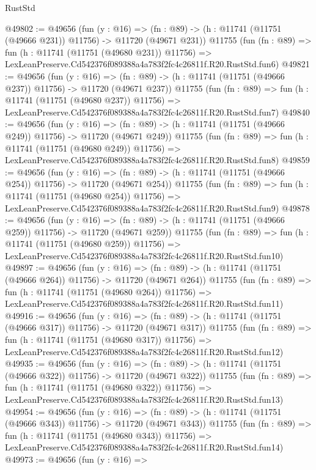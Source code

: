 \begin{lexlean}{RustStd}
\begin{coremodule}
@49802 := @49656
    (fun (y : @16) =>
    (fn : @89) -> (h : @11741 (@11751 (@49666 @231)) @11756) -> @11720 (@49671 @231))
    @11755
    (fun (fn : @89) =>
    fun (h : @11741 (@11751 (@49680 @231)) @11756) =>
    LexLeanPreserve.Cd542376f089388a4a783f2fc4c26811f.R20.RustStd.fun6)
@49821 := @49656
    (fun (y : @16) =>
    (fn : @89) -> (h : @11741 (@11751 (@49666 @237)) @11756) -> @11720 (@49671 @237))
    @11755
    (fun (fn : @89) =>
    fun (h : @11741 (@11751 (@49680 @237)) @11756) =>
    LexLeanPreserve.Cd542376f089388a4a783f2fc4c26811f.R20.RustStd.fun7)
@49840 := @49656
    (fun (y : @16) =>
    (fn : @89) -> (h : @11741 (@11751 (@49666 @249)) @11756) -> @11720 (@49671 @249))
    @11755
    (fun (fn : @89) =>
    fun (h : @11741 (@11751 (@49680 @249)) @11756) =>
    LexLeanPreserve.Cd542376f089388a4a783f2fc4c26811f.R20.RustStd.fun8)
@49859 := @49656
    (fun (y : @16) =>
    (fn : @89) -> (h : @11741 (@11751 (@49666 @254)) @11756) -> @11720 (@49671 @254))
    @11755
    (fun (fn : @89) =>
    fun (h : @11741 (@11751 (@49680 @254)) @11756) =>
    LexLeanPreserve.Cd542376f089388a4a783f2fc4c26811f.R20.RustStd.fun9)
@49878 := @49656
    (fun (y : @16) =>
    (fn : @89) -> (h : @11741 (@11751 (@49666 @259)) @11756) -> @11720 (@49671 @259))
    @11755
    (fun (fn : @89) =>
    fun (h : @11741 (@11751 (@49680 @259)) @11756) =>
    LexLeanPreserve.Cd542376f089388a4a783f2fc4c26811f.R20.RustStd.fun10)
@49897 := @49656
    (fun (y : @16) =>
    (fn : @89) -> (h : @11741 (@11751 (@49666 @264)) @11756) -> @11720 (@49671 @264))
    @11755
    (fun (fn : @89) =>
    fun (h : @11741 (@11751 (@49680 @264)) @11756) =>
    LexLeanPreserve.Cd542376f089388a4a783f2fc4c26811f.R20.RustStd.fun11)
@49916 := @49656
    (fun (y : @16) =>
    (fn : @89) -> (h : @11741 (@11751 (@49666 @317)) @11756) -> @11720 (@49671 @317))
    @11755
    (fun (fn : @89) =>
    fun (h : @11741 (@11751 (@49680 @317)) @11756) =>
    LexLeanPreserve.Cd542376f089388a4a783f2fc4c26811f.R20.RustStd.fun12)
@49935 := @49656
    (fun (y : @16) =>
    (fn : @89) -> (h : @11741 (@11751 (@49666 @322)) @11756) -> @11720 (@49671 @322))
    @11755
    (fun (fn : @89) =>
    fun (h : @11741 (@11751 (@49680 @322)) @11756) =>
    LexLeanPreserve.Cd542376f089388a4a783f2fc4c26811f.R20.RustStd.fun13)
@49954 := @49656
    (fun (y : @16) =>
    (fn : @89) -> (h : @11741 (@11751 (@49666 @343)) @11756) -> @11720 (@49671 @343))
    @11755
    (fun (fn : @89) =>
    fun (h : @11741 (@11751 (@49680 @343)) @11756) =>
    LexLeanPreserve.Cd542376f089388a4a783f2fc4c26811f.R20.RustStd.fun14)
@49973 := @49656
    (fun (y : @16) =>

\end{coremodule}
\end{lexlean}

